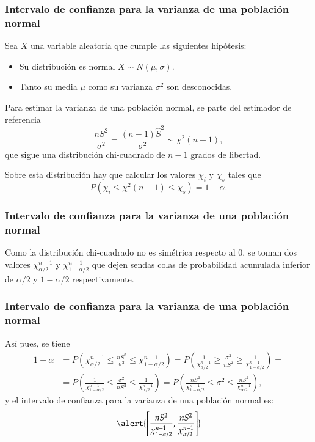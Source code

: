 \begin{frame}
\frametitle{Intervalo de confianza para la varianza de una población normal}
Sea $X$ una variable aleatoria que cumple las siguientes hipótesis:
\begin{itemize}
\item Su distribución es normal $X\sim N(\mu,\sigma)$.
\item Tanto su media $\mu$ como su varianza $\sigma^2$ son desconocidas.
\end{itemize}

Para estimar la varianza de una población normal, se parte del estimador de referencia
\[
\frac{nS^2}{\sigma^2} = \frac{(n-1)\hat{S}^2}{\sigma^2}\sim \chi^2(n-1),
\]
que sigue una distribución chi-cuadrado de $n-1$ grados de libertad.

Sobre esta distribución hay que calcular los valores $\chi_i$ y $\chi_s$ tales que
\[
P(\chi_i\leq \chi^2(n-1) \leq \chi_s) = 1-\alpha.
\]
\end{frame}


\begin{frame}
\frametitle{Intervalo de confianza para la varianza de una población normal}
Como la distribución chi-cuadrado no es simétrica respecto al 0, se toman dos valores $\chi^{n-1}_{\alpha/2}$ y $\chi^{n-1}_{1-\alpha/2}$ que dejen sendas colas de probabilidad acumulada inferior de $\alpha/2$ y $1-\alpha/2$ respectivamente.
\begin{center}
\scalebox{0.6}{}
\end{center}
\end{frame}


\begin{frame}
\frametitle{Intervalo de confianza para la varianza de una población normal}
Así pues, se tiene
\[
\begin{align*}
1-\alpha &= P\left(\chi^{n-1}_{\alpha/2}\leq \frac{nS^2}{\sigma^2}  \leq \chi^{n-1}_{1-\alpha/2}\right) = 
P\left(\frac{1}{\chi^{n-1}_{\alpha/2}}\geq \frac{\sigma^2}{nS^2}  \geq \frac{1}{\chi^{n-1}_{1-\alpha/2}}\right)=\\
&= P\left(\frac{1}{\chi^{n-1}_{1-\alpha/2}}\leq \frac{\sigma^2}{nS^2}  \leq \frac{1}{\chi^{n-1}_{\alpha/2}}\right) 
= P\left(\frac{nS^2}{\chi^{n-1}_{1-\alpha/2}}\leq \sigma^2  \leq \frac{nS^2}{\chi^{n-1}_{\alpha/2}}\right),
\end{align*}
\]
y el intervalo de confianza para la varianza de una población normal es:
\[
\alert{\left[\frac{nS^2}{\chi^{n-1}_{1-\alpha/2}},\frac{nS^2}{\chi^{n-1}_{\alpha/2}}\right]}
\]
\end{frame}


